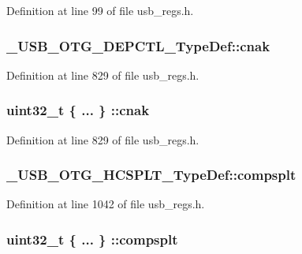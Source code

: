 Definition at line 99 of file usb\-\_\-regs.\-h.

\hypertarget{group___u_s_b___o_t_g___d_r_i_v_e_r_ga3e56a457c5ef0c5073133f6136baef92}{
\subsubsection[{cnak}]{ \-\_\-\-U\-S\-B\-\_\-\-O\-T\-G\-\_\-\-D\-E\-P\-C\-T\-L\-\_\-\-Type\-Def\-::cnak}}\label{group___u_s_b___o_t_g___d_r_i_v_e_r_ga3e56a457c5ef0c5073133f6136baef92}


Definition at line 829 of file usb\-\_\-regs.\-h.

\hypertarget{group___u_s_b___o_t_g___d_r_i_v_e_r_gaedddce8983cea85f77291ffb3dbd9edb}{
\subsubsection[{cnak}]{\setlength{\rightskip}{0pt plus 5cm}uint32\-\_\-t \{ ... \} \-::cnak}}\label{group___u_s_b___o_t_g___d_r_i_v_e_r_gaedddce8983cea85f77291ffb3dbd9edb}


Definition at line 829 of file usb\-\_\-regs.\-h.

\hypertarget{group___u_s_b___o_t_g___d_r_i_v_e_r_ga13228295441150f61ba577a08d667dc7}{
\subsubsection[{compsplt}]{ \-\_\-\-U\-S\-B\-\_\-\-O\-T\-G\-\_\-\-H\-C\-S\-P\-L\-T\-\_\-\-Type\-Def\-::compsplt}}\label{group___u_s_b___o_t_g___d_r_i_v_e_r_ga13228295441150f61ba577a08d667dc7}


Definition at line 1042 of file usb\-\_\-regs.\-h.

\hypertarget{group___u_s_b___o_t_g___d_r_i_v_e_r_gad4497a562455c592c593106cf384747f}{
\subsubsection[{compsplt}]{\setlength{\rightskip}{0pt plus 5cm}uint32\-\_\-t \{ ... \} \-::compsplt}}\label{group___u_s_b___o_t_g___d_r_i_v_e_r_gad4497a562455c592c593106cf384747f}


